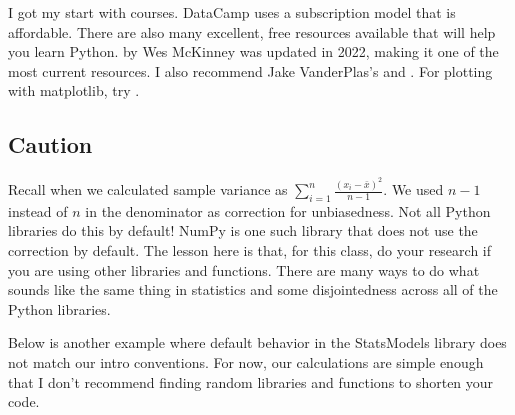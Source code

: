 \documentclass{article}
\begin{document}
I got my start with  courses. DataCamp uses a subscription model that is affordable. There are also many excellent, free resources available that will help you learn Python.  by Wes McKinney was updated in 2022, making it one of the most current resources. I also recommend Jake VanderPlas's  and . For plotting with matplotlib, try . 

\subsection{Caution}

Recall when we calculated sample variance as $\sum_{i=1}^n \frac{(x_i - \bar{x})^2}{n-1}$. We used $n-1$ instead of $n$ in the denominator as correction for unbiasedness. Not all Python libraries do this by default! NumPy is one such library that does not use the correction by default. The lesson here is that, for this class, do your research if you are using other libraries and functions. There are many ways to do what sounds like the same thing in statistics and some disjointedness across all of the Python libraries. 

Below is another example where default behavior in the StatsModels library does not match our intro conventions. For now, our calculations are simple enough that I don't recommend finding random libraries and functions to shorten your code. 

\end{document}
